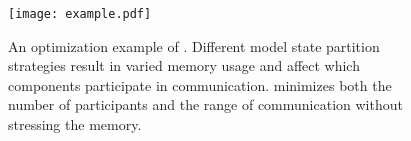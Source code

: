 
\begin{figure}[t]
    \centering
    \texttt{[image: example.pdf]}
    \caption{An optimization example of \SysName. Different model state partition strategies result in varied memory usage and affect which components participate in communication. \SysName minimizes both the number of participants and the range of communication without stressing the memory.}
    \label{example}
\end{figure}

